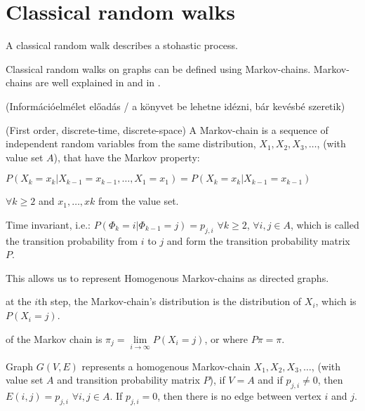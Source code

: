 \section{Classical random walks}

A classical random walk describes a stohastic process.


Classical random walks on graphs can be defined using Markov-chains. Markov-chains
are well explained in \cite{BreimanProbability} and in \cite{XiaReview}.


(Információelmélet előadás / a könyvet be lehetne idézni, bár kevésbé szeretik)

 (First order, discrete-time, discrete-space) A Markov-chain is a sequence of independent random variables from the same distribution, $X_1, X_2, X_3, \dots$, (with value set $A$), that have the Markov property:


$P(X_k = x_k | X_{k-1} = x_{k-1}, \dots, X_1 = x_1) = P(X_k = x_k | X_{k-1} = x_{k-1})$

$\forall k\geq{}2$ and $x_{1},\dots, x{k}$ from the value set.

 Time invariant, i.e.:
$P(\Phi_k = i | \Phi_{k-1} = j) = p_{j,i}$ $\forall k\geq{}2$, $\forall i,j \in{} A$, which is called the transition probability from $i$ to $j$ and form the transition probability matrix $P$.

This allows us to represent Homogenous Markov-chains as directed graphs.

 at the $i$th step, the Markov-chain's distribution is the distribution of $X_i$, which is $P(X_i = j)$.

 of the Markov chain is $\pi_{j} = \lim\limits_{i \to \infty} P(X_i = j)$, or where $P\pi = \pi$.

Graph $G(V,E)$ represents a homogenous Markov-chain $X_1, X_2, X_3, \dots$, (with value set $A$ and transition probability matrix $P$), if $V=A$ and if $p_{j,i} \neq{} 0$, then $E(i,j) = p_{j,i}$ $\forall{}i,j\in{}A$. If $p_{j,i} = 0$, then there is no edge between vertex $i$ and $j$.

